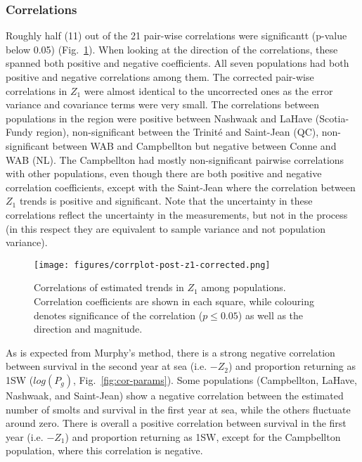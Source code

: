 \documentclass[12pt]{article}
\begin{document}
\subsubsection*{Correlations}

Roughly half (11) out of the 21 pair-wise correlations were significantt (p-value below 0.05)
(Fig.~\ref{fig:s1-corr}). When looking at the direction of the correlations,
these spanned both positive and negative coefficients. All seven populations had both
positive and negative correlations among them.
The corrected pair-wise correlations in $Z_1$ were almost identical to the
uncorrected ones as the error variance and covariance terms were very small.
The correlations between populations in the region were positive between Nashwaak and LaHave (Scotia-Fundy region), non-significant between the Trinit\'{e} and Saint-Jean (QC), 
non-significant between WAB and Campbellton but negative between Conne and WAB (NL).
The Campbellton had mostly non-significant pairwise correlations with other populations, even though there are both positive and negative correlation coefficients, except with the Saint-Jean
where the correlation between $Z_1$ trends is positive and significant.
Note that the uncertainty in these correlations reflect the uncertainty in the
measurements, but not in the process (in this respect they are equivalent to
sample variance and not population variance). 

\begin{figure}[htbp] \centering
    \texttt{[image: figures/corrplot-post-z1-corrected.png]} \caption{
        Correlations of estimated trends in $Z_1$ among populations. 
        Correlation coefficients are shown in each square, while colouring 
        denotes significance of the correlation ($p \leq 0.05$) as well as the direction and magnitude.}
\label{fig:s1-corr} 
\end{figure}

As is expected from Murphy's method, there is a strong negative correlation
between survival in the second year at sea (i.e. $-Z_2$) and proportion returning
as 1SW ($log(P_g)$, Fig.~\ref{fig:cor-params}). Some populations (Campbellton,
LaHave, Nashwaak, and Saint-Jean) show a negative correlation between the
estimated number of smolts and survival in the first year at sea, while the
others fluctuate around zero. There is overall a positive correlation between
survival in the first year (i.e. $-Z_1$) and proportion returning as 1SW,
except for the Campbellton population, where this correlation is negative.
\end{document}
